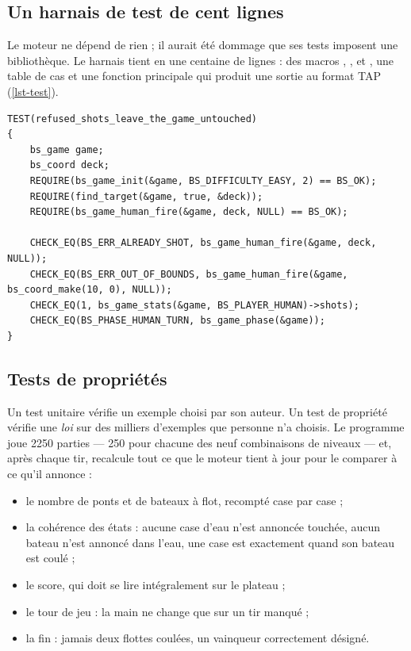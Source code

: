 \subsection{Un harnais de test de cent lignes}

Le moteur ne dépend de rien ; il aurait été dommage que ses tests imposent une bibliothèque.
Le harnais  tient en une centaine de lignes : des macros
, ,  et , une table de cas et une
fonction principale qui produit une sortie au format TAP (\cref{lst-test}).

\begin{lstlisting}[basicstyle=\ttfamily\footnotesize,
                   caption={Un test unitaire : un tir refusé ne modifie rien (exigence~C4).},
                   label={lst-test}]
TEST(refused_shots_leave_the_game_untouched)
{
    bs_game game;
    bs_coord deck;
    REQUIRE(bs_game_init(&game, BS_DIFFICULTY_EASY, 2) == BS_OK);
    REQUIRE(find_target(&game, true, &deck));
    REQUIRE(bs_game_human_fire(&game, deck, NULL) == BS_OK);

    CHECK_EQ(BS_ERR_ALREADY_SHOT, bs_game_human_fire(&game, deck, NULL));
    CHECK_EQ(BS_ERR_OUT_OF_BOUNDS, bs_game_human_fire(&game, bs_coord_make(10, 0), NULL));
    CHECK_EQ(1, bs_game_stats(&game, BS_PLAYER_HUMAN)->shots);
    CHECK_EQ(BS_PHASE_HUMAN_TURN, bs_game_phase(&game));
}
\end{lstlisting}

\subsection{Tests de propriétés}
\label{sec-proprietes}

Un test unitaire vérifie un exemple choisi par son auteur. Un test de propriété vérifie une
\emph{loi} sur des milliers d'exemples que personne n'a choisis. Le programme
 joue \num{2250} parties --- 250 pour chacune des neuf
combinaisons de niveaux --- et, après chaque tir, recalcule tout ce que le moteur tient à
jour pour le comparer à ce qu'il annonce :

\begin{itemize}
    \item le nombre de ponts et de bateaux à flot, recompté case par case ;
    \item la cohérence des états : aucune case d'eau n'est annoncée touchée, aucun bateau
          n'est annoncé dans l'eau, une case est  exactement quand son bateau est
          coulé ;
    \item le score, qui doit se lire intégralement sur le plateau ;
    \item le tour de jeu : la main ne change que sur un tir manqué ;
    \item la fin : jamais deux flottes coulées, un vainqueur correctement désigné.
\end{itemize}


